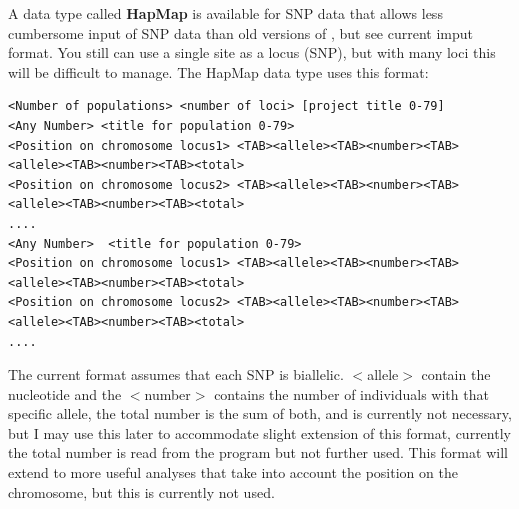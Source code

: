\vskip 0.5cm
A data type called \textbf{HapMap} is available for SNP data that allows less cumbersome input of SNP data than old versions of \migrate, but see current imput format.
You still can use a single site as a locus (SNP), but with many loci this will be difficult to manage. The HapMap data type uses this format:
 \begin{small}
\begin{tt}
\begin{verbatim}
<Number of populations> <number of loci> [project title 0-79]
<Any Number> <title for population 0-79>
<Position on chromosome locus1> <TAB><allele><TAB><number><TAB><allele><TAB><number><TAB><total>
<Position on chromosome locus2> <TAB><allele><TAB><number><TAB><allele><TAB><number><TAB><total>
....
<Any Number>  <title for population 0-79>
<Position on chromosome locus1> <TAB><allele><TAB><number><TAB><allele><TAB><number><TAB><total>
<Position on chromosome locus2> <TAB><allele><TAB><number><TAB><allele><TAB><number><TAB><total>
....
\end{verbatim}
\end{tt}
\end{small}
The current format assumes that each SNP is biallelic. $<$allele$>$ contain the nucleotide and the $<$number$>$ contains the number of individuals with that specific allele, the total number is the sum of both,
and is currently not necessary, but I may use this later to accommodate slight extension of this format, currently the total number is read from the program but not further used. This format will extend to more useful analyses that take into account the position on the chromosome, but this is currently not used.
